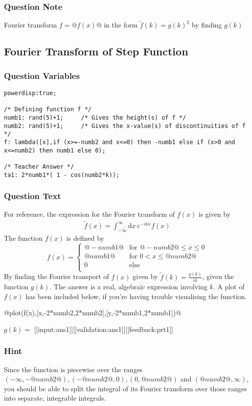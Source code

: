 \documentclass[a4paper,10pt]{article}
\begin{document}
\subsubsection{Question Note}
Fourier transform \(f = @f(x)@\) in the form \(\tilde{f}(k) = g(k)^2\) by finding \(g(k)\)

\subsection{Fourier Transform of Step Function}
\subsubsection{Question Variables}
\begin{lstlisting}
powerdisp:true;

/* Defining function f */
numb1: rand(5)+1;     /* Gives the height(s) of f */
numb2: rand(5)+1;     /* Gives the x-value(s) of discontinuities of f */
f: lambda([x],if (x>=-numb2 and x<=0) then -numb1 else if (x>0 and x<=numb2) then numb1 else 0);

/* Teacher Answer */
ta1: 2*numb1*( 1 - cos(numb2*k));
\end{lstlisting}
\subsubsection{Question Text}
For reference, the expression for the Fourier transform of $f(x)$ is given by \begin{align*}
\tilde{f}(x) = \int_{-\infty}^{\infty} \text{d}x \, e^{-ikx}f(x)
\end{align*}The function \(f(x)\) is defined by \[ f(x) = \begin{cases} @-numb1@ & \text{for } @-numb2@ \leq x \leq 0\\ @numb1@ & \text{for } 0 < x \leq @numb2@\\ 0 & \text{else} \\ \end{cases} \] By finding the Fourier transport of $f(x)$ given by \(\tilde{f}(k) = \frac{g(k)}{ik}\), given the function \(g(k)\). The answer is a real, algebraic expression involving $k$. A plot of \(f(x)\) has been included below, if you're having trouble visualising the function.

@plot(f(x),[x,-2*numb2,2*numb2],[y,-2*numb1,2*numb1])@

\(g(k) = \) [[input:ans1]][[validation:ans1]][[feedback:prt1]]
\subsubsection{Hint}
Since the function is piecewise over the ranges \((-\infty,-@numb2@),(-@numb2@,0),(0,@numb2@)\) and \((@numb2@,\infty)\), you should be able to split the integral of its Fourier transform over those ranges into separate, integrable integrals.
\end{document}
